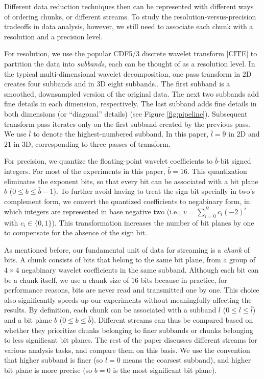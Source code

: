 Different data reduction
techniques then can be represented with different ways of ordering chunks, or different streams.
To study the resolution-versus-precision tradeoffs in data analysis, however, we still need to
associate each chunk with a resolution and a precision level.

For resolution, we use the popular CDF5/3 discrete wavelet transform [CITE] to partition the data
into \emph{subbands}, each can be thought of as a resolution level. In the typical multi-dimensional
wavelet decomposition, one pass transform in 2D creates four subbands and in 3D eight subbands.. The first subband is a
smoothed, downsampled version of the original data. The next two subbands add fine details in each
dimension, respectively. The last subband adds fine details in both dimensions (or ``diagonal''
details) (see Figure \ref{fig:pipeline}). Subsequent transform pass iterates only on the first
subband created by the previous pass. We use $\bar{l}$ to denote the highest-numbered subband. In
this paper, $\bar{l}=9$ in 2D and $21$ in 3D, corresponding to three passes of transform.

For precision, we quantize the floating-point wavelet coefficients to $\bar{b}$-bit signed integers.
For most of the experiments in this paper, $\bar{b}=16$. This quantization eliminates the exponent
bits, so that every bit can be associated with a bit plane $b$ ($0\leq b\leq \bar{b}-1$). To further
avoid having to treat the sign bit specially in two's complement form, we convert the quantized
coefficients to negabinary form, in which integers are represented in base negative two (i.e.,
$v=\sum_{i=0}^{B}{c_i(-2)^i}$ with $c_i\in \{0,1\}$). This transformation increases the number of
bit planes by one to compensate for the absence of the sign bit.

As mentioned before, our fundamental unit of data for streaming is a \emph{chunk} of bits. A chunk
consists of bits that belong to the same bit plane, from a group of $4\times 4$ negabinary wavelet
coefficients in the same subband. Although each bit can be a chunk itself, we use a chunk size of
$16$ bits because in practice, for performance reasons, bits are never read and transmitted one by
one. This choice also significantly speeds up our experiments without meaningfully affecting the
results. By definition, each chunk can be associated with a subband $l$ ($0\leq l\leq \bar{l}$) and
a bit plane $b$ ($0\leq b\leq \bar{b}$). Different streams can thus be compared based on whether
they prioritize chunks belonging to finer subbands or chunks belonging to less significant bit
planes. The rest of the paper discusses different streams for various analysis tasks, and compare
them on this basis. We use the convention that higher subband is finer (so $l=0$ means the coarsest
subband), and higher bit plane is more precise (so $b=0$ is the most significant bit plane).

